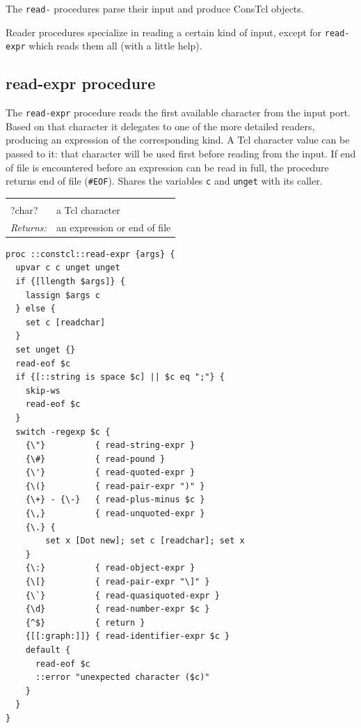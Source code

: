 \documentclass[twoside]{report}
\begin{document}
The \texttt{read-} procedures parse their input and produce ConsTcl objects.

Reader procedures specialize in reading a certain kind of input, except for \texttt{read-expr} which reads them all (with a little help).

\subsection{read-expr procedure}
\label{readexpr-procedure}

The \texttt{read-expr} procedure reads the first available character from the input port. Based on that character it delegates to one of the more detailed readers, producing an expression of the corresponding kind. A Tcl character value can be passed to it: that character will be used first before reading from the input. If end of file is encountered before an expression can be read in full, the procedure returns end of file (\texttt{\#EOF}). Shares the variables \texttt{c} and \texttt{unget} with its caller.

\noindent\begin{tabular}{ |p{1.9cm} p{8cm}| }
\hline
\rowcolor[HTML]{CCCCCC} \multicolumn{2}{|l|}{\bf read-expr (internal)} \\
?char? & a Tcl character \\
\textit{Returns:} & an expression or end of file \\
\hline
\end{tabular}

\begin{lstlisting}
proc ::constcl::read-expr {args} {
  upvar c c unget unget
  if {[llength $args]} {
    lassign $args c
  } else {
    set c [readchar]
  }
  set unget {}
  read-eof $c
  if {[::string is space $c] || $c eq ";"} {
    skip-ws
    read-eof $c
  }
  switch -regexp $c {
    {\"}          { read-string-expr }
    {\#}          { read-pound }
    {\'}          { read-quoted-expr }
    {\(}          { read-pair-expr ")" }
    {\+} - {\-}   { read-plus-minus $c }
    {\,}          { read-unquoted-expr }
    {\.} {
        set x [Dot new]; set c [readchar]; set x
    }
    {\:}          { read-object-expr }
    {\[}          { read-pair-expr "\]" }
    {\`}          { read-quasiquoted-expr }
    {\d}          { read-number-expr $c }
    {^$}          { return }
    {[[:graph:]]} { read-identifier-expr $c }
    default {
      read-eof $c
      ::error "unexpected character ($c)"
    }
  }
}
\end{lstlisting}
\end{document}

